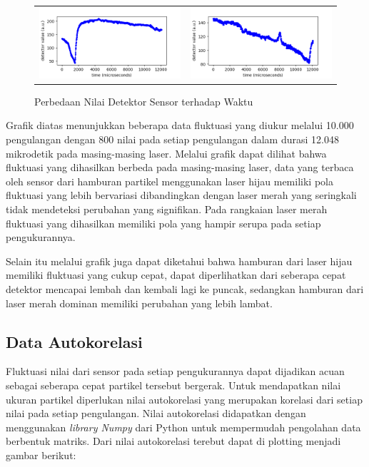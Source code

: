 \begin{figure}
  \ContinuedFloat
  \begin{longtable}{p{7cm}p{7cm}}
    \includegraphics[width=8cm]{Images/RawData_Hijau_Data1000-01.png}
    \centering{Laser Hijau}
    &
    \includegraphics[width=8cm]{Images/RawData_Merah_Data1000-01.png} 
    \centering{Laser Merah}\\
  \end{longtable}

  \caption{Perbedaan Nilai Detektor Sensor terhadap Waktu}
\end{figure}

Grafik diatas menunjukkan beberapa data fluktuasi yang diukur
melalui 10.000 pengulangan dengan 800 nilai pada setiap
pengulangan dalam durasi 12.048 mikrodetik pada masing-masing
laser. Melalui grafik dapat dilihat bahwa fluktuasi yang
dihasilkan berbeda pada masing-masing laser, data yang terbaca
oleh sensor dari hamburan partikel menggunakan laser hijau
memiliki pola fluktuasi yang lebih bervariasi dibandingkan
dengan laser merah yang seringkali tidak mendeteksi perubahan
yang signifikan. Pada rangkaian laser merah  fluktuasi yang
dihasilkan memiliki pola yang hampir serupa pada setiap
pengukurannya.

Selain itu melalui grafik juga dapat diketahui bahwa hamburan
dari laser hijau memiliki fluktuasi yang cukup cepat, dapat
diperlihatkan dari seberapa cepat detektor mencapai lembah dan
kembali lagi ke puncak, sedangkan hamburan dari laser merah
dominan memiliki perubahan yang lebih lambat.

\subsection{Data Autokorelasi}
Fluktuasi nilai dari sensor pada setiap pengukurannya dapat
dijadikan acuan sebagai seberapa cepat partikel tersebut
bergerak. Untuk mendapatkan nilai ukuran partikel diperlukan
nilai autokorelasi yang merupakan korelasi dari setiap nilai
pada setiap pengulangan. Nilai autokorelasi didapatkan dengan
menggunakan \textit{library Numpy} dari Python untuk mempermudah
pengolahan data berbentuk matriks. Dari nilai autokorelasi
terebut dapat di plotting menjadi gambar berikut:

